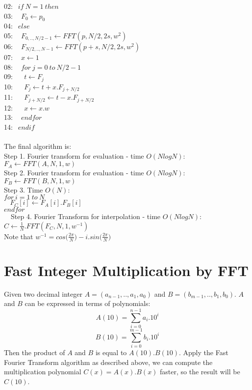 \documentclass{article}
\begin{document}
02: $\ \ if \ N = 1 \ then$ \\
03: $\ \ \ \ F_0 \leftarrow p_0$ \\
04: $\ \ else$ \\
05: $\ \ \ \ F_{0, .., N/2 - 1} \leftarrow FFT(p, N/2, 2s, w^2)$ \\
06: $\ \ \ \ F_{N/2, .., N - 1} \leftarrow FFT(p + s, N/2, 2s, w^2)$ \\
07: $\ \ \ \ x \leftarrow 1$ \\
08: $\ \ \ \ for \ j = 0 \ to \ N/2 - 1$ \\
09: $\ \ \ \ \ \ t \leftarrow F_j$ \\
10: $\ \ \ \ \ \ F_j \leftarrow t + x.F_{j + N/2}$ \\
11: $\ \ \ \ \ \ F_{j + N/2} \leftarrow t - x.F_{j + N/2}$ \\
12: $\ \ \ \ \ \ x \leftarrow x.w$ \\
13: $\ \ \ \ endfor$ \\
14: $\ \ endif$ \\ \\
The final algorithm is: \\
Step 1. Fourier transform for evaluation - time $O(NlogN)$: $F_A \leftarrow FFT(A, N, 1, w)$ \\
Step 2. Fourier transform for evaluation - time $O(NlogN)$: $F_B \leftarrow FFT(B, N, 1, w)$ \\
Step 3. Time $O(N)$: \\
$for \ i = 1 \ to \ N$ \\
$\ \ \ \ F_C[i] \leftarrow F_A[i] . F_B[i]$ \\
$endfor$ \\
\ \ Step 4. Fourier Transform for interpolation - time $O(NlogN)$: $C \leftarrow \frac{1}{N} . FFT(F_C, N, 1, w^{-1})$ \\
Note that $w^{-1} = cos\big(\frac{2\pi}{N}\big) - i.sin\big(\frac{2\pi}{N}\big)$

\section{Fast Integer Multiplication by FFT}
Given two decimal integer $A = (a_{n - 1}, .., a_1, a_0)$ and $B = (b_{m - 1}, .., b_1, b_0)$. $A$ and $B$ can be expressed in terms of polynomials:
$$A(10) = \sum\limits_{i = 0}^{n - 1} a_i.10^i$$
$$B(10) = \sum\limits_{i = 0}^{m - 1} b_i.10^i$$
Then the product of $A$ and $B$ is equal to $A(10).B(10)$. Apply the Fast Fourier Transform algorithm as described above, we can compute the multiplication polynomial $C(x) = A(x).B(x)$ faster, so the result will be $C(10)$.
\end{document}
